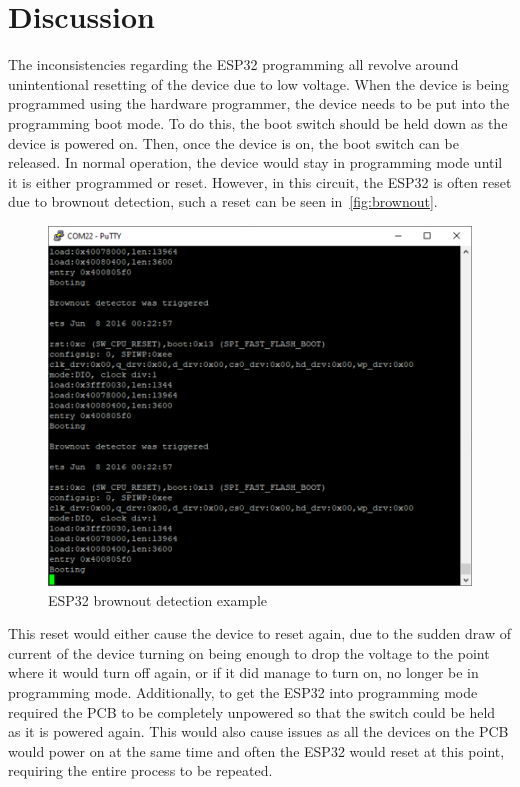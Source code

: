 \section{Discussion}
The inconsistencies regarding the ESP32 programming all revolve around unintentional resetting of the device due to low voltage.
When the device is being programmed using the hardware programmer, the device needs to be put into the programming boot mode.
To do this, the boot switch should be held down as the device is powered on. Then, once the device is on, the boot switch can be released.
In normal operation, the device would stay in programming mode until it is either programmed or reset.
However, in this circuit, the ESP32 is often reset due to brownout detection, such a reset can be seen in~\autoref{fig:brownout}.

\begin{figure}[!ht]
  \caption{ESP32 brownout detection example}\label{fig:brownout}
  \centering
  \includegraphics[width=\textwidth/2]{chapters/development/brownout_detection}
\end{figure}

This reset would either cause the device to reset again,
due to the sudden draw of current of the device turning on being enough to drop the voltage to the point where it would turn off again,
or if it did manage to turn on, no longer be in programming mode.
Additionally, to get the ESP32 into programming mode required the PCB to be completely unpowered
so that the switch could be held as it is powered again.
This would also cause issues as all the devices on the PCB would power on at the same time and often the ESP32 would reset at this point,
requiring the entire process to be repeated.

